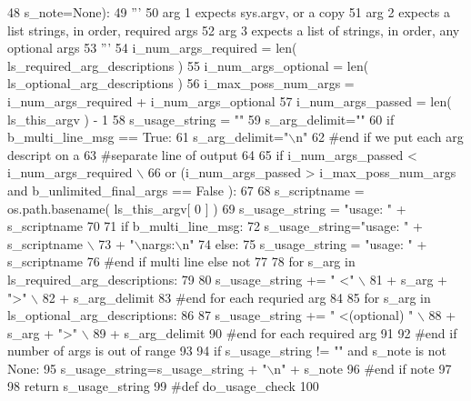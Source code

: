 \begin{DoxyCode}
48             s\_note=\textcolor{keywordtype}{None}):
49     \textcolor{stringliteral}{'''}
50 \textcolor{stringliteral}{    arg 1 expects sys.argv, or a copy}
51 \textcolor{stringliteral}{    arg 2 expects a list strings, in order, required args}
52 \textcolor{stringliteral}{    arg 3 expects a list of strings, in order, any optional args}
53 \textcolor{stringliteral}{    '''}
54     i\_num\_args\_required = len( ls\_required\_arg\_descriptions )
55     i\_num\_args\_optional = len( ls\_optional\_arg\_descriptions )
56     i\_max\_poss\_num\_args = i\_num\_args\_required + i\_num\_args\_optional 
57     i\_num\_args\_passed = len( ls\_this\_argv ) - 1  
58     s\_usage\_string = \textcolor{stringliteral}{""}
59     s\_arg\_delimit=\textcolor{stringliteral}{""}
60     \textcolor{keywordflow}{if} b\_multi\_line\_msg == \textcolor{keyword}{True}:
61         s\_arg\_delimit=\textcolor{stringliteral}{"\(\backslash\)n"}
62     \textcolor{comment}{#end if we put each arg descript on a }
63     \textcolor{comment}{#separate line of output}
64 
65     \textcolor{keywordflow}{if} i\_num\_args\_passed <  i\_num\_args\_required  \(\backslash\)
66             \textcolor{keywordflow}{or} (i\_num\_args\_passed > i\_max\_poss\_num\_args \textcolor{keywordflow}{and} b\_unlimited\_final\_args == \textcolor{keyword}{False} ): 
67     
68         s\_scriptname = os.path.basename( ls\_this\_argv[ 0 ] )    
69         s\_usage\_string = \textcolor{stringliteral}{"usage: "} + s\_scriptname 
70 
71         \textcolor{keywordflow}{if} b\_multi\_line\_msg:
72             s\_usage\_string=\textcolor{stringliteral}{"usage: "} + s\_scriptname \(\backslash\)
73                     + \textcolor{stringliteral}{"\(\backslash\)nargs:\(\backslash\)n"}
74         \textcolor{keywordflow}{else}:
75             s\_usage\_string = \textcolor{stringliteral}{"usage: "} + s\_scriptname 
76         \textcolor{comment}{#end if multi line else not}
77 
78         \textcolor{keywordflow}{for} s\_arg \textcolor{keywordflow}{in} ls\_required\_arg\_descriptions:
79 
80             s\_usage\_string += \textcolor{stringliteral}{" <"} \(\backslash\)
81                 + s\_arg + \textcolor{stringliteral}{">"} \(\backslash\)
82                 + s\_arg\_delimit
83         \textcolor{comment}{#end for each requried arg}
84 
85         \textcolor{keywordflow}{for} s\_arg \textcolor{keywordflow}{in} ls\_optional\_arg\_descriptions:
86 
87             s\_usage\_string += \textcolor{stringliteral}{" <(optional) "} \(\backslash\)
88                 + s\_arg + \textcolor{stringliteral}{">"} \(\backslash\)
89                 + s\_arg\_delimit
90         \textcolor{comment}{#end for each required arg}
91 
92     \textcolor{comment}{#end if number of args is out of range}
93 
94     \textcolor{keywordflow}{if} s\_usage\_string != \textcolor{stringliteral}{""} \textcolor{keywordflow}{and} s\_note \textcolor{keywordflow}{is} \textcolor{keywordflow}{not} \textcolor{keywordtype}{None}:
95         s\_usage\_string=s\_usage\_string + \textcolor{stringliteral}{"\(\backslash\)n"} + s\_note
96     \textcolor{comment}{#end if note }
97 
98     \textcolor{keywordflow}{return}  s\_usage\_string 
99 \textcolor{comment}{#def do\_usage\_check}
100 
\end{DoxyCode}
